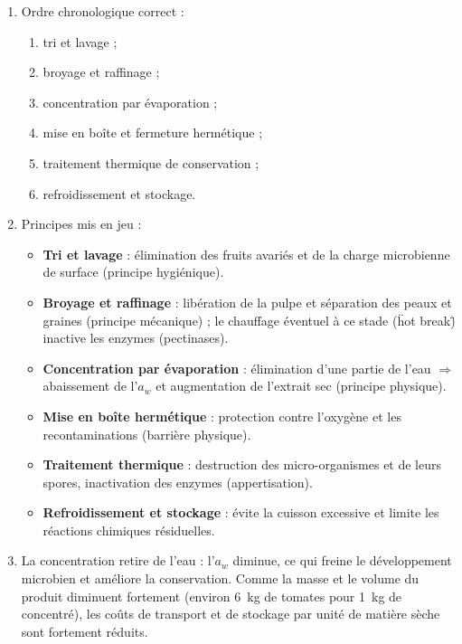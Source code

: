 \documentclass[11pt]{article}
\begin{document}
\begin{corrige}
\begin{enumerate}
\item Ordre chronologique correct :
\begin{enumerate}
\item tri et lavage ;
\item broyage et raffinage ;
\item concentration par évaporation ;
\item mise en boîte et fermeture hermétique ;
\item traitement thermique de conservation ;
\item refroidissement et stockage.
\end{enumerate}
\item Principes mis en jeu :
\begin{itemize}
\item \textbf{Tri et lavage} : élimination des fruits avariés et de la charge microbienne de surface (principe hygiénique).
\item \textbf{Broyage et raffinage} : libération de la pulpe et séparation des peaux et graines (principe mécanique) ; le chauffage éventuel à ce stade (\"hot break\") inactive les enzymes (pectinases).
\item \textbf{Concentration par évaporation} : élimination d'une partie de l'eau $\Rightarrow$ abaissement de l'$a_w$ et augmentation de l'extrait sec (principe physique).
\item \textbf{Mise en boîte hermétique} : protection contre l'oxygène et les recontaminations (barrière physique).
\item \textbf{Traitement thermique} : destruction des micro-organismes et de leurs spores, inactivation des enzymes (appertisation).
\item \textbf{Refroidissement et stockage} : évite la cuisson excessive et limite les réactions chimiques résiduelles.
\end{itemize}
\item La concentration retire de l'eau : l'$a_w$ diminue, ce qui freine le développement microbien et améliore la conservation. Comme la masse et le volume du produit diminuent fortement (environ \SI{6}{kg} de tomates pour \SI{1}{kg} de concentré), les coûts de transport et de stockage par unité de matière sèche sont fortement réduits.
\end{enumerate}
\end{corrige}
\end{document}
